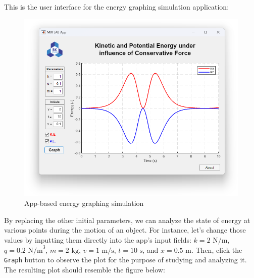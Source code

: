 \documentclass[13pt,a4paper]{report}
\begin{document}
\vspace{0.2cm}

This is the user interface for the energy graphing simulation application:

\vspace{-0.25cm}
\begin{figure}[!ht]
  \centering
  \includegraphics[scale=0.6]{result.png}
  \vspace{-0.75cm}
  \caption{App-based energy graphing simulation}
  \label{fig:result}
\end{figure}

\newpage
By replacing the other initial parameters, we can analyze the state of energy at various points during the motion of an object. For instance, let's change those values by inputting them directly into the app's input fields: $k=2\text{ N/m}$, $q=0.2\text{ N/m}^3$, $m=2\text{ kg}$, $v=1\text{ m/s}$, $t=10\text{ s}$, and $x=0.5\text{ m}$. Then, click the \texttt{Graph} button to observe the plot for the purpose of studying and analyzing it. The resulting plot should resemble the figure below:
\end{document}
